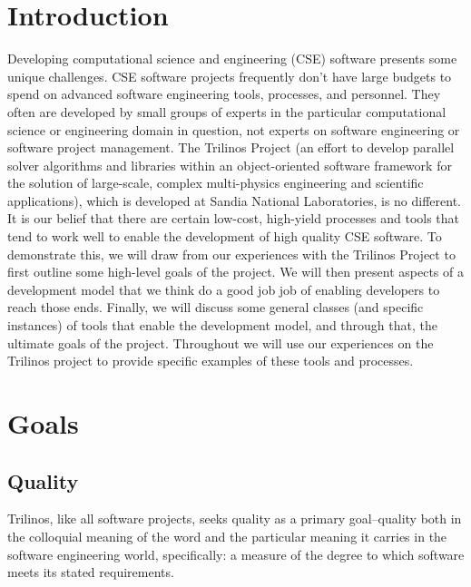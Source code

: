 \documentclass[12pt,relax]{article}
\begin{document}
\clearpage
\tableofcontents

\clearpage


\section{Introduction}
\label{Section:Introduction}

Developing computational science and engineering (CSE) software presents some 
unique challenges.  CSE software projects frequently don't have large budgets 
to spend on advanced software engineering tools, processes, and personnel.  
They often are developed by small groups of experts in the particular 
computational science or engineering domain in question, not experts on 
software engineering or software project management.  The Trilinos Project
(an effort to develop parallel solver algorithms and libraries within an
object-oriented software framework for the solution of large-scale, complex
multi-physics engineering and scientific applications), which is developed at
Sandia National Laboratories, is no different.  It is our belief that 
there are certain low-cost, high-yield processes and tools that tend to work 
well to enable the development of high quality CSE software.  To demonstrate 
this, we will draw from our experiences with the Trilinos Project to first
outline some high-level goals of the project.  We will then present aspects of
a development model that we think do a good job job of enabling developers to
reach those ends.  Finally, we will discuss some general classes (and specific
instances) of tools that enable the development model, and through that, 
the ultimate goals of the project.  Throughout we will use our experiences on 
the Trilinos project to provide specific examples of these tools and processes.


\section{Goals}
\label{Section:Goals}

\subsection{Quality}
Trilinos, like all software projects, seeks quality as a primary goal--quality
both in the colloquial meaning of the word and the particular meaning it
carries in the software engineering world, specifically:  a measure of the
degree to which software meets its stated requirements.
\end{document}
